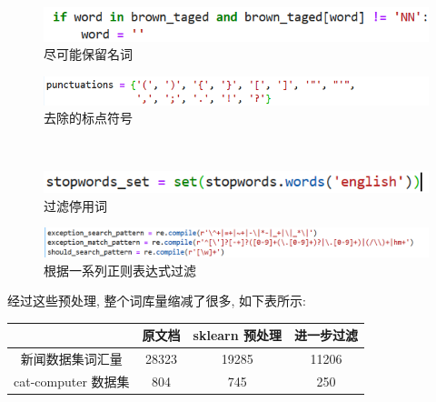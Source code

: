 \documentclass[UTF8]{article}
\newcommand{\jumpLine} {\hspace*{\fill} \par}
\begin{document}
\begin{minipage}{\linewidth/2}
\begin{figure}[H]
	\centering
	\includegraphics[width=\linewidth]{image/filter_keepnn.png}
	\caption{尽可能保留名词}
\end{figure}
\end{minipage}
\begin{minipage}{\linewidth/2}
\begin{figure}[H]
	\centering
	\includegraphics[width=\linewidth]{image/filter_punctuations.png}
	\caption{去除的标点符号}
\end{figure}
\end{minipage}\\
\begin{minipage}{\linewidth/2}
\begin{figure}[H]
	\centering
	\includegraphics[width=\linewidth]{image/filter_stopwords.png}
	\caption{过滤停用词}
\end{figure}
\end{minipage}
\begin{minipage}{\linewidth/2}
\begin{figure}[H]
	\centering
	\includegraphics[width=\linewidth]{image/filter_re.png}
	\caption{根据一系列正则表达式过滤}
\end{figure}
\end{minipage}
\jumpLine

经过这些预处理, 整个词库量缩减了很多, 如下表所示:\\
\begin{center}
\begin{tabular}{|c|c|c|c|}
\hline
 & 原文档 & sklearn 预处理 & 进一步过滤 \\
\hline
新闻数据集词汇量 & 28323 & 19285 & 11206 \\
\hline
cat-computer 数据集 & 804 & 745 & 250 \\
\hline
\end{tabular}
\end{center}
\end{document}
